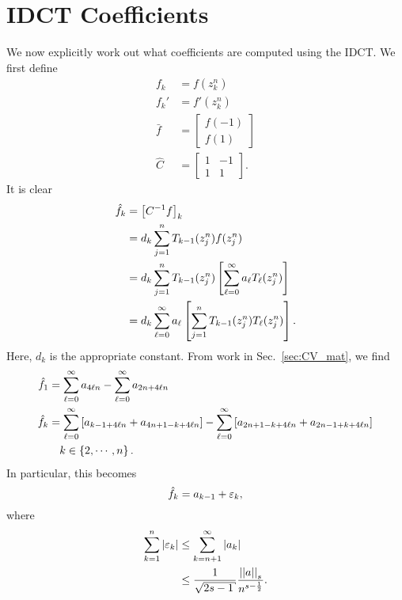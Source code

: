 \section{IDCT Coefficients}
\label{sec:cvip_idct}

We now explicitly work out what coefficients are computed using the IDCT.
We first define
%
\begin{align}
    f_{k} &= f(z_{k}^{n}) \nonumber\\
    f_{k}' &= f'(z_{k}^{n}) \nonumber\\
    \bar{f} &= \begin{bmatrix} f(-1) \\ f(1) \end{bmatrix} \nonumber\\
    \widehat{C} &= \begin{bmatrix} 1 & -1 \\ 1 & 1 \end{bmatrix}.
\end{align}
%
It is clear
%
\begin{align}
    \hat{f}_{k} &= \left[ C^{-1}f \right]_{k} \nonumber\\
    &= d_{k}\sum_{j=1}^{n} T_{k-1}(z_{j}^{n})f(z_{j}^{n})
        \nonumber\\
    &= d_{k}\sum_{j=1}^{n}T_{k-1}(z_{j}^{n})\left[ 
        \sum_{\ell=0}^{\infty}a_{\ell}T_{\ell}(z_{j}^{n}) \right] \nonumber\\
    &= d_{k}\sum_{\ell=0}^{\infty} a_{\ell}\left[ 
        \sum_{j=1}^{n}T_{k-1}(z_{j}^{n})T_{\ell}(z_{j}^{n}) \right].
\end{align}
%
Here, $d_{k}$ is the appropriate constant. From work in
Sec.~\ref{sec:CV_mat}, we find
%
\begin{align}
    \hat{f}_{1} &= \sum_{\ell=0}^{\infty} a_{4\ell n}
            - \sum_{\ell=0}^{\infty} a_{2n+4\ell n} \nonumber\\
    \hat{f}_{k} &= \sum_{\ell=0}^{\infty} \left[ 
            a_{k-1+4\ell n} + a_{4n+1-k+4\ell n} \right] - \sum_{\ell=0}^{\infty}
        \left[ a_{2n+1-k+4\ell n} + a_{2n-1+k+4\ell n} \right] \nonumber\\
    &\quad k\in\left\{ 2,\cdots,n \right\}.
\end{align}
%
In particular, this becomes
%
\begin{equation}
    \hat{f}_{k} = a_{k-1} + \varepsilon_{k},
    \label{eq:cvip_idct_fhat}
\end{equation}
%
where
%
\begin{align}
    \sum_{k=1}^{n} \abs{\eps_{k}} &\le \sum_{k=n+1}^{\infty} \abs{a_{k}}
        \nonumber\\
    &\le \frac{1}{\sqrt{2s-1}}\frac{\norm{a}_{s}}{n^{s-\frac{1}{2}}}.
    \label{eq:cvip_eps_sum}
\end{align}

